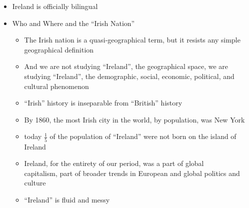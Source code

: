 \documentclass[12pt]{article}
\begin{document}
\begin{itemize}
                \item Ireland is officially bilingual
                \item Who and Where and the ``Irish Nation''
                \begin{itemize}
                    \item The Irish nation is a quasi-geographical term, but it resists any simple geographical definition
                    \item And we are not studying ``Ireland'', the geographical space, we are studying ``Ireland'', the demographic, social, economic, political, and cultural phenomenon
                    \item ``Irish'' history is inseparable from ``British'' history
                    \item By 1860, the most Irish city in the world, by population, was New York
                    \item today $\frac{1}{5}$ of the population of ``Ireland'' were not born on the island of Ireland
                    \item Ireland, for the entirety of our period, was a part of global \\capitalism, part of broader trends in European and global politics and culture
                    \item ``Ireland'' is fluid and messy
                \end{itemize}
            \end{itemize}
\end{document}
